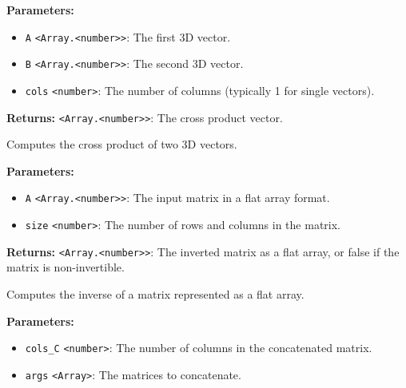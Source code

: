 \documentclass[12pt,a4paper]{article}
\begin{document}
\vspace{5mm}
\noindent {}


\noindent \textbf{Parameters:}
\begin{itemize}
  \item \texttt{A} \texttt{<Array.<number>>}: The first 3D vector.
  \item \texttt{B} \texttt{<Array.<number>>}: The second 3D vector.
  \item \texttt{cols} \texttt{<number>}: The number of columns (typically 1 for single vectors).
\end{itemize}

\noindent \textbf{Returns:} \texttt{<Array.<number>>}: The cross product vector.

\noindent Computes the cross product of two 3D vectors.

\vspace{5mm}
\noindent {}


\noindent \textbf{Parameters:}
\begin{itemize}
  \item \texttt{A} \texttt{<Array.<number>>}: The input matrix in a flat array format.
  \item \texttt{size} \texttt{<number>}: The number of rows and columns in the matrix.
\end{itemize}

\noindent \textbf{Returns:} \texttt{<Array.<number>>}: The inverted matrix as a flat array, or \textasciigrave{}false\textasciigrave{} if the matrix is non-invertible.

\noindent Computes the inverse of a matrix represented as a flat array.

\vspace{5mm}
\noindent {}


\noindent \textbf{Parameters:}
\begin{itemize}
  \item \texttt{cols\_C} \texttt{<number>}: The number of columns in the concatenated matrix.
  \item \texttt{args} \texttt{<Array>}: The matrices to concatenate.
\end{itemize}
\end{document}
